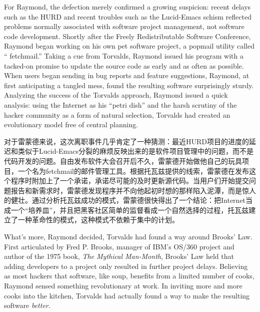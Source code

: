 
\ifdefined\eng
For Raymond, the defection merely confirmed a growing suspicion: recent delays such as the HURD and recent troubles such as the Lucid-Emacs schism reflected problems normally associated with software project management, not software code development. Shortly after the Freely Redistributable Software Conference, Raymond began working on his own pet software project, a popmail utility called `` fetchmail.'' Taking a cue from Torvalds, Raymond issued his program with a tacked-on promise to update the source code as early and as often as possible. When users began sending in bug reports and feature suggestions, Raymond, at first anticipating a tangled mess, found the resulting software surprisingly sturdy. Analyzing the success of the Torvalds approach, Raymond issued a quick analysis: using the Internet as his ``petri dish'' and the harsh scrutiny of the hacker community as a form of natural selection, Torvalds had created an evolutionary model free of central planning.
\fi

\ifdefined\chs
对于雷蒙德来说，这次离职事件几乎肯定了一种猜测：最近HURD项目的进度的延迟和类似于Lucid-Emacs分裂的麻烦反映出来的是软件项目管理中的问题，而不是代码开发的问题。自由发布软件大会召开后不久，雷蒙德开始做他自己的玩具项目，一个名为fetchmail的邮件管理工具。根据托瓦兹提供的线索，雷蒙德在发布这个程序时附加上了一个承诺，承诺尽可能的及时更新源代码。当用户们开始提交问题报告和新需求时，雷蒙德发现程序并不向他起初时想的那样陷入泥潭，而是惊人的健壮。通过分析托瓦兹成功的模式，雷蒙德很快得出了一个结论：把Internet当成一个``培养皿''，并且把黑客社区简单的监督看成一个自然选择的过程，托瓦兹建立了一种革命性的模式，这种模式不依赖于集中的计划。
\fi

\ifdefined\eng
What's more, Raymond decided, Torvalds had found a way around Brooks' Law. First articulated by Fred P. Brooks, manager of IBM's OS/360 project and author of the 1975 book, \textit{The Mythical Man-Month}, Brooks' Law held that adding developers to a project only resulted in further project delays. Believing as most hackers that software, like soup, benefits from a limited number of cooks, Raymond sensed something revolutionary at work. In inviting more and more cooks into the kitchen, Torvalds had actually found a way to make the resulting software \textit{better}.
\fi

